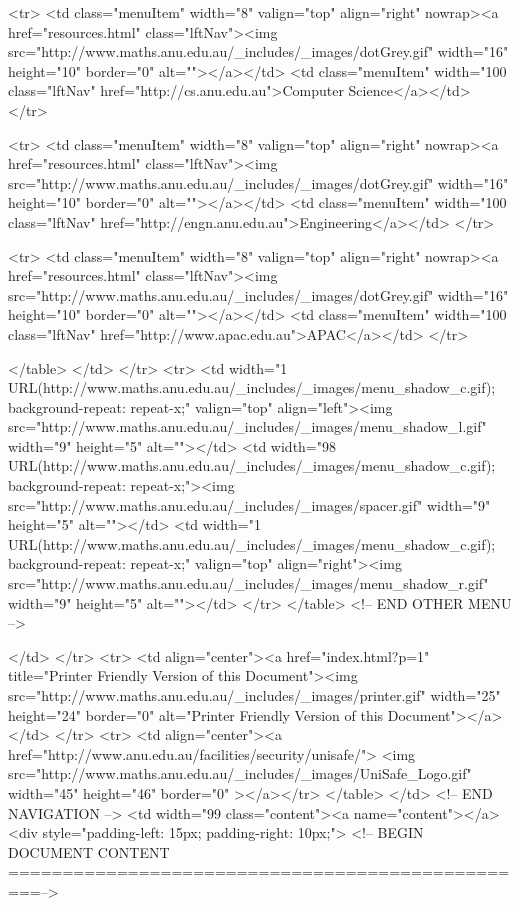 \begin{html}
  <tr>
    <td class="menuItem" width="8"
    valign="top" align="right" nowrap><a
    href="resources.html"
    class="lftNav"><img src="http://www.maths.anu.edu.au/_includes/_images/dotGrey.gif" width="16"
    height="10" border="0" alt=""></a></td>
    <td class="menuItem" width="100%
    class="lftNav"
    href="http://cs.anu.edu.au">Computer Science</a></td>
  </tr>


  <tr>
    <td class="menuItem" width="8"
    valign="top" align="right" nowrap><a
    href="resources.html"
    class="lftNav"><img src="http://www.maths.anu.edu.au/_includes/_images/dotGrey.gif" width="16"
    height="10" border="0" alt=""></a></td>
    <td class="menuItem" width="100%
    class="lftNav"
    href="http://engn.anu.edu.au">Engineering</a></td>
  </tr>



  <tr>
    <td class="menuItem" width="8"
    valign="top" align="right" nowrap><a
    href="resources.html"
    class="lftNav"><img src="http://www.maths.anu.edu.au/_includes/_images/dotGrey.gif" width="16"
    height="10" border="0" alt=""></a></td>
    <td class="menuItem" width="100%
    class="lftNav"
    href="http://www.apac.edu.au">APAC</a></td>
  </tr>



  </table>
  </td>
</tr>
<tr>
  <td width="1%
  URL(http://www.maths.anu.edu.au/_includes/_images/menu_shadow_c.gif); background-repeat: repeat-x;"
  valign="top" align="left"><img src="http://www.maths.anu.edu.au/_includes/_images/menu_shadow_l.gif"
  width="9" height="5" alt=""></td>
  <td width="98%
  URL(http://www.maths.anu.edu.au/_includes/_images/menu_shadow_c.gif); background-repeat:
  repeat-x;"><img src="http://www.maths.anu.edu.au/_includes/_images/spacer.gif" width="9" height="5"
  alt=""></td>
  <td width="1%
  URL(http://www.maths.anu.edu.au/_includes/_images/menu_shadow_c.gif); background-repeat: repeat-x;"
  valign="top" align="right"><img src="http://www.maths.anu.edu.au/_includes/_images/menu_shadow_r.gif"
  width="9" height="5" alt=""></td>
</tr>
</table>
<!-- END OTHER MENU -->




  </td>
</tr>
<tr>
  <td align="center"><a href="index.html?p=1"
  title="Printer Friendly Version of this Document"><img
  src="http://www.maths.anu.edu.au/_includes/_images/printer.gif" width="25" height="24" border="0"
  alt="Printer Friendly Version of this Document"></a></td>
</tr>
<tr>
  <td align="center"><a href="http://www.anu.edu.au/facilities/security/unisafe/">
  <img src="http://www.maths.anu.edu.au/_includes/_images/UniSafe_Logo.gif" width="45" height="46" border="0"
></a></tr>
</table>
</td>
<!-- END NAVIGATION -->
    <td width="99%
        class="content"><a name="content"></a>
      <div style="padding-left: 15px; padding-right: 10px;">
<!-- BEGIN DOCUMENT CONTENT =================================================-->
\end{html}
